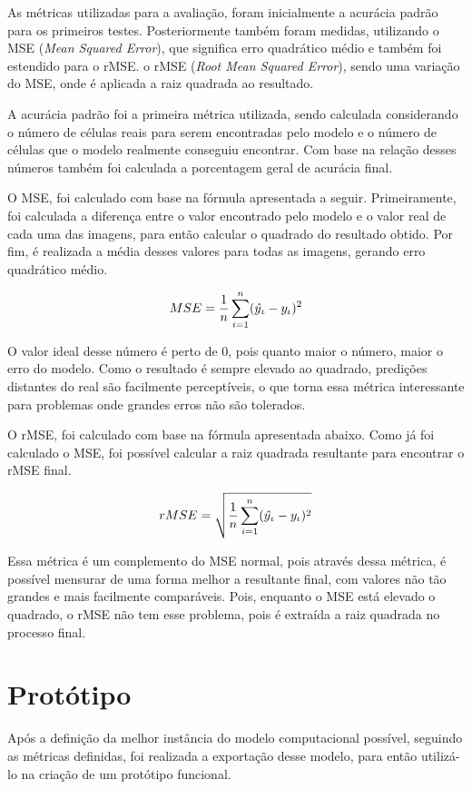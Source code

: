 As métricas utilizadas para a avaliação, foram inicialmente a acurácia padrão para os primeiros testes. Posteriormente também foram medidas, utilizando o MSE (\emph{Mean Squared Error}), que significa erro quadrático médio e também foi estendido para o rMSE. o rMSE (\emph{Root Mean Squared Error}), sendo uma variação do MSE, onde é aplicada a raiz quadrada ao resultado.

A acurácia padrão foi a primeira métrica utilizada, sendo calculada considerando o número de células reais para serem encontradas pelo modelo e o número de células que o modelo realmente conseguiu encontrar. Com base na relação desses números também foi calculada a porcentagem geral de acurácia final.

O MSE, foi calculado com base na fórmula apresentada a seguir. Primeiramente, foi calculada a diferença entre o valor encontrado pelo modelo e o valor real de cada uma das imagens, para então calcular o quadrado do resultado obtido. Por fim, é realizada a média desses valores para todas as imagens, gerando erro quadrático médio.

\[ MSE = \frac{1}{n}\sum_{i=1}^{n} (\skew{4.5}\hat{y}_\iota - y_\iota)^{2} \]

O valor ideal desse número é perto de 0, pois quanto maior o número, maior o erro do modelo. Como o resultado é sempre elevado ao quadrado, predições distantes do real são facilmente perceptíveis, o que torna essa métrica interessante para problemas onde grandes erros não são tolerados.

O rMSE, foi calculado com base na fórmula apresentada abaixo. Como já foi calculado o MSE, foi possível calcular a raiz quadrada resultante para encontrar o rMSE final.

\[ rMSE = \sqrt{\frac{1}{n}\sum_{i=1}^{n} (\skew{4.5}\hat{y}_\iota - y_\iota)^{2}} \]

Essa métrica é um complemento do MSE normal, pois através dessa métrica, é possível mensurar de uma forma melhor a resultante final, com valores não tão grandes e mais facilmente comparáveis. Pois, enquanto o MSE está elevado o quadrado, o rMSE não tem esse problema, pois é extraída a raiz quadrada no processo final.

\section{Protótipo}
Após a definição da melhor instância do modelo computacional possível, seguindo as métricas definidas, foi realizada a exportação desse modelo, para então utilizá-lo na criação de um protótipo funcional.

